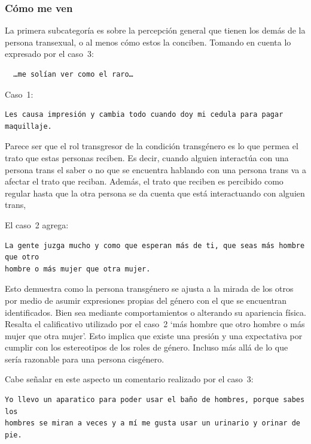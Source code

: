 \subsubsection{Cómo me ven}

La primera subcategoría es sobre la percepción general que tienen los demás de
la persona transexual, o al menos cómo estos la conciben. Tomando en cuenta lo
expresado por el caso~3:

\begin{verbatim}
  …me solían ver como el raro…
\end{verbatim}

Caso~1:

\begin{verbatim}
Les causa impresión y cambia todo cuando doy mi cedula para pagar maquillaje.
\end{verbatim}

Parece ser que el rol transgresor de la condición transgénero es lo que permea
el trato que estas personas reciben. Es decir, cuando alguien interactúa con una
persona trans el saber o no que se encuentra hablando con una persona trans va a
afectar el trato que reciban. Además, el trato que reciben es percibido como
regular hasta que la otra persona se da cuenta que está interactuando con
alguien trans,

El caso~2 agrega:

\begin{verbatim}
La gente juzga mucho y como que esperan más de ti, que seas más hombre que otro
hombre o más mujer que otra mujer.
\end{verbatim}

Esto demuestra como la persona transgénero se ajusta a la mirada de los otros
por medio de asumir expresiones propias del género con el que se encuentran
identificados. Bien sea mediante comportamientos o alterando su apariencia
física. Resalta el calificativo utilizado por el caso~2 ‘más hombre que otro
hombre o más mujer que otra mujer’. Esto implica que existe una presión y una
expectativa por cumplir con los estereotipos de los roles de género. Incluso más
allá de lo que sería razonable para una persona cisgénero.

Cabe señalar en este aspecto un comentario realizado por el caso~3:

\begin{verbatim}
Yo llevo un aparatico para poder usar el baño de hombres, porque sabes los
hombres se miran a veces y a mí me gusta usar un urinario y orinar de pie.
\end{verbatim}

